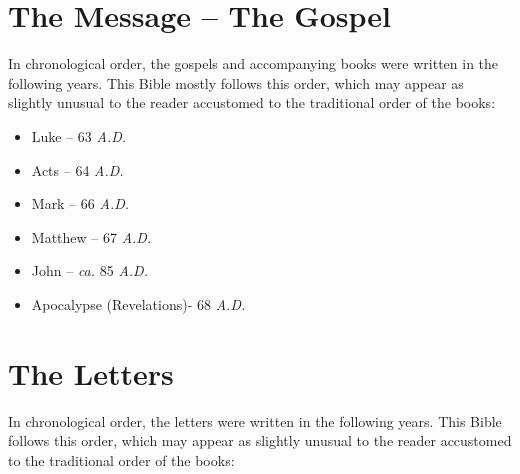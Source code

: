 \documentclass[std]{jbible}
\begin{document}
















\part{The Message -- The Gospel}

In chronological order, the gospels and accompanying books were written in the following years. This Bible mostly follows this order, which may appear as slightly unusual to the reader accustomed to the traditional order of the books:

\begin{itemize}
  \item Luke – 63 \emph{A.D.}
  \item Acts – 64 \emph{A.D.}
  \item Mark – 66 \emph{A.D.}
  \item Matthew – 67 \emph{A.D.}
  \item John – \emph{ca.} 85 \emph{A.D.}
  \item Apocalypse (Revelations)- 68 \emph{A.D.}
\end{itemize}








\part{The Letters}

In chronological order, the letters were written in the following years. This Bible follows this order, which may appear as slightly unusual to the reader accustomed to the traditional order of the books:
\end{document}
